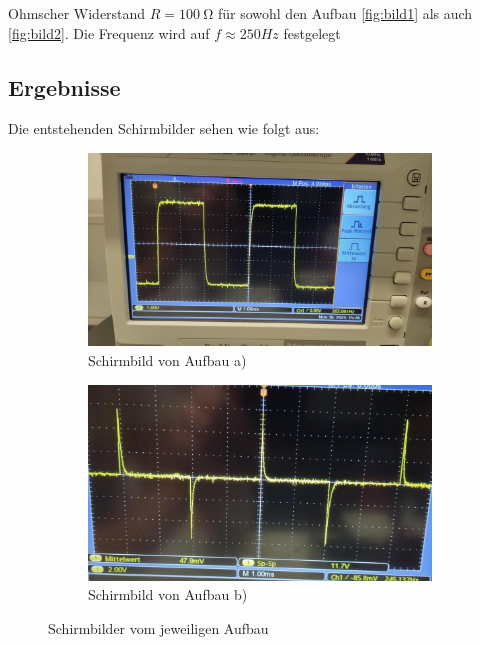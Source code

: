         Ohmscher Widerstand $R = 100\ \mathrm{\Omega}$ für sowohl den Aufbau \ref{fig:bild1} als auch \ref{fig:bild2}. Die Frequenz wird auf $f \approx 250Hz $ festgelegt

    \subsection{Ergebnisse}
        
        Die entstehenden Schirmbilder sehen wie folgt aus:
        
        \begin{figure}[H]
            \centering
        	\begin{subfigure}{0.48\linewidth}
        		\includegraphics[width=\linewidth]{bilder/teila.png}
        		\caption{Schirmbild von Aufbau a)}
        		\label{fig:biold4}
        	\end{subfigure}
        	\hfill
        	\begin{subfigure}{0.48\linewidth}
        		\includegraphics[width=\linewidth]{bilder/teilb.png}
        		\caption{Schirmbild von Aufbau b)}
        		\label{fig:bild3}
        	\end{subfigure}
        	\caption{Schirmbilder vom jeweiligen Aufbau}
        	\label{fig:zwei-bilder-schirme}
        \end{figure}
        
